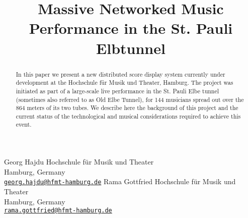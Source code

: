 

\def\papertitle{Massive Networked Music Performance in the St. Pauli Elbtunnel
}
\def\firstauthor{Georg Hajdu}
\def\secondauthor{Rama Gottfried}

\def\Hochschule{ Hochschule f\"ur Musik und Theater}

\title{\papertitle}
\twoauthors
   {\firstauthor} {	
      Hochschule f\"ur Musik und Theater\\
         Hamburg, Germany \\ %
   \small{\tt \href{mailto:georg.hajdu@hfmt-hamburg.de}{georg.hajdu@hfmt-hamburg.de}}}
    {\secondauthor} {
   Hochschule f\"ur Musik und Theater\\
   Hamburg, Germany \\ %
   \small{\tt \href{mailto:rama.gottfried@hfmt-hamburg.de}{rama.gottfried@hfmt-hamburg.de}}}





%

\capstartfalse
\maketitle
\capstarttrue
%
\begin{abstract}
In this paper we present a new distributed score display system currently under development at the Hochschule f\"ur Musik und Theater, Hamburg.
The project was initiated as part of a large-scale live performance in the St. Pauli Elbe tunnel (sometimes also referred to as Old Elbe Tunnel), for 144 musicians spread out over the 864 meters of its two tubes.
We describe here the background of this project and the current status of the technological and musical considerations required to achieve this event.

\end{abstract}



